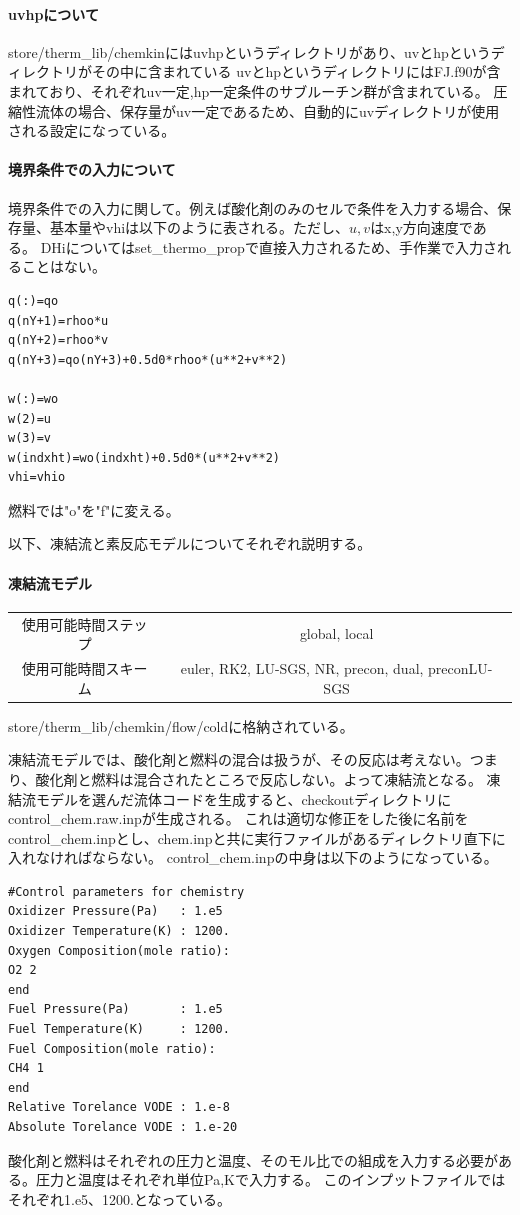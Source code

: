 \documentclass{jsarticle}
\begin{document}
\paragraph{uvhpについて}%
store/therm\_lib/chemkinにはuvhpというディレクトリがあり、uvとhpというディレクトリがその中に含まれている
uvとhpというディレクトリにはFJ.f90が含まれており、それぞれuv一定,hp一定条件のサブルーチン群が含まれている。
圧縮性流体の場合、保存量がuv一定であるため、自動的にuvディレクトリが使用される設定になっている。

\paragraph{境界条件での入力について}%
境界条件での入力に関して。例えば酸化剤のみのセルで条件を入力する場合、保存量、基本量やvhiは以下のように表される。ただし、$u,v$はx,y方向速度である。
DHiについてはset\_thermo\_propで直接入力されるため、手作業で入力されることはない。
\begin{verbatim}
q(:)=qo
q(nY+1)=rhoo*u
q(nY+2)=rhoo*v
q(nY+3)=qo(nY+3)+0.5d0*rhoo*(u**2+v**2)

w(:)=wo
w(2)=u
w(3)=v
w(indxht)=wo(indxht)+0.5d0*(u**2+v**2)
vhi=vhio
\end{verbatim}
燃料では"o"を"f"に変える。

\hspace{1em}

以下、凍結流と素反応モデルについてそれぞれ説明する。

\paragraph{凍結流モデル}%
\begin{center}
\begin{tabular}{c||c}\hline
使用可能時間ステップ & global, local\\
使用可能時間スキーム & euler, RK2, LU-SGS, NR, precon, dual, preconLU-SGS\\
\hline
\end{tabular}
\end{center}
store/therm\_lib/chemkin/flow/coldに格納されている。

凍結流モデルでは、酸化剤と燃料の混合は扱うが、その反応は考えない。つまり、酸化剤と燃料は混合されたところで反応しない。よって凍結流となる。
凍結流モデルを選んだ流体コードを生成すると、checkoutディレクトリにcontrol\_chem.raw.inpが生成される。
これは適切な修正をした後に名前をcontrol\_chem.inpとし、chem.inpと共に実行ファイルがあるディレクトリ直下に入れなければならない。
control\_chem.inpの中身は以下のようになっている。
\begin{verbatim}
#Control parameters for chemistry
Oxidizer Pressure(Pa)   : 1.e5
Oxidizer Temperature(K) : 1200.
Oxygen Composition(mole ratio):
O2 2
end
Fuel Pressure(Pa)       : 1.e5
Fuel Temperature(K)     : 1200.
Fuel Composition(mole ratio):
CH4 1
end
Relative Torelance VODE : 1.e-8
Absolute Torelance VODE : 1.e-20
\end{verbatim}
酸化剤と燃料はそれぞれの圧力と温度、そのモル比での組成を入力する必要がある。圧力と温度はそれぞれ単位Pa,Kで入力する。
このインプットファイルではそれぞれ1.e5、1200.となっている。
\end{document}
